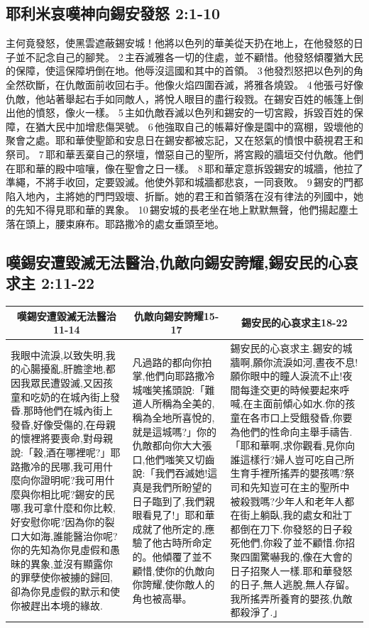 \subsection{耶利米哀嘆神向錫安發怒 2:1-10}
主何竟發怒，使黑雲遮蔽錫安城！他將以色列的華美從天扔在地上，在他發怒的日子並不記念自己的腳凳。 2 主吞滅雅各一切的住處，並不顧惜。他發怒傾覆猶大民的保障，使這保障坍倒在地。他辱沒這國和其中的首領。 3 他發烈怒把以色列的角全然砍斷，在仇敵面前收回右手。他像火焰四圍吞滅，將雅各燒毀。 4 他張弓好像仇敵，他站著舉起右手如同敵人，將悅人眼目的盡行殺戮。在錫安百姓的帳篷上倒出他的憤怒，像火一樣。 5 主如仇敵吞滅以色列和錫安的一切宮殿，拆毀百姓的保障，在猶大民中加增悲傷哭號。 6 他強取自己的帳幕好像是園中的窩棚，毀壞他的聚會之處。耶和華使聖節和安息日在錫安都被忘記，又在怒氣的憤恨中藐視君王和祭司。 7 耶和華丟棄自己的祭壇，憎惡自己的聖所，將宮殿的牆垣交付仇敵。他們在耶和華的殿中喧嚷，像在聖會之日一樣。 8 耶和華定意拆毀錫安的城牆，他拉了準繩，不將手收回，定要毀滅。他使外郭和城牆都悲哀，一同衰敗。 9 錫安的門都陷入地內，主將她的門閂毀壞、折斷。她的君王和首領落在沒有律法的列國中，她的先知不得見耶和華的異象。 10 錫安城的長老坐在地上默默無聲，他們揚起塵土落在頭上，腰束麻布。耶路撒冷的處女垂頭至地。

\subsection{嘆錫安遭毀滅无法醫治,仇敵向錫安誇耀,錫安民的心哀求主 2:11-22}
\begin{table}[H]
\centering
\begin{tabular}{p{5.7cm}|p{4.15cm}|p{6.80cm}}\hline\hline
\multicolumn{1}{c|}{嘆錫安遭毀滅无法醫治11-14}&\multicolumn{1}{c|}{仇敵向錫安誇耀15-17}&\multicolumn{1}{c}{錫安民的心哀求主18-22}\\\hline
我眼中流淚,以致失明,我的心腸擾亂,肝膽塗地,都因我眾民遭毀滅,又因孩童和吃奶的在城內街上發昏.那時他們在城內街上發昏,好像受傷的,在母親的懷裡將要喪命,對母親說:「穀,酒在哪裡呢?」耶路撒冷的民哪,我可用什麼向你證明呢?我可用什麼與你相比呢?錫安的民哪,我可拿什麼和你比較,好安慰你呢?因為你的裂口大如海,誰能醫治你呢?你的先知為你見虛假和愚昧的異象,並沒有顯露你的罪孽使你被擄的歸回,卻為你見虛假的默示和使你被趕出本境的緣故. 
&凡過路的都向你拍掌,他們向耶路撒冷城嗤笑搖頭說:「難道人所稱為全美的,稱為全地所喜悅的,就是這城嗎?」你的仇敵都向你大大張口,他們嗤笑又切齒說:「我們吞滅她!這真是我們所盼望的日子臨到了,我們親眼看見了!」耶和華成就了他所定的,應驗了他古時所命定的。他傾覆了並不顧惜,使你的仇敵向你誇耀,使你敵人的角也被高舉。 
&錫安民的心哀求主.錫安的城牆啊,願你流淚如河,晝夜不息!願你眼中的瞳人淚流不止!夜間每逢交更的時候要起來呼喊,在主面前傾心如水.你的孩童在各市口上受餓發昏,你要為他們的性命向主舉手禱告.「耶和華啊,求你觀看,見你向誰這樣行?婦人豈可吃自己所生育手裡所搖弄的嬰孩嗎?祭司和先知豈可在主的聖所中被殺戮嗎?少年人和老年人都在街上躺臥,我的處女和壯丁都倒在刀下.你發怒的日子殺死他們,你殺了並不顧惜.你招聚四圍驚嚇我的,像在大會的日子招聚人一樣.耶和華發怒的日子,無人逃脫,無人存留。我所搖弄所養育的嬰孩,仇敵都殺淨了.」
\\\hline
\end{tabular}
\end{table}

